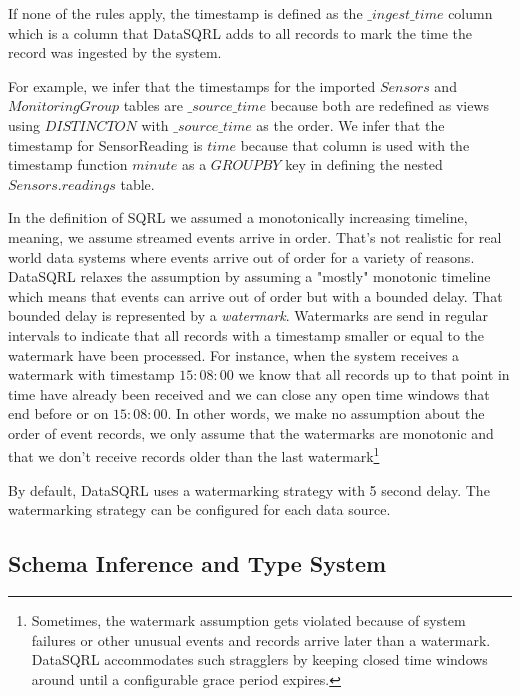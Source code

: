 \documentclass[	DIV=calc,%
							paper=letter,%
							fontsize=11pt,%
							twocolumn]{scrartcl}	 					%
\begin{document}
If none of the rules apply, the timestamp is defined as the $\_ingest\_time$ column which is a column that DataSQRL adds to all records to mark the time the record was ingested by the system.

For example, we infer that the timestamps for the imported $Sensors$ and $MonitoringGroup$ tables are $\_source\_time$ because both are redefined as views using $DISTINCT ON$ with $\_source\_time$ as the order. We infer that the timestamp for SensorReading is $time$ because that column is used with the timestamp function $minute$ as a $GROUP BY$ key in defining the nested $Sensors.readings$ table.

In the definition of SQRL we assumed a monotonically increasing timeline, meaning, we assume streamed events arrive in order. That's not realistic for real world data systems where events arrive out of order for a variety of reasons. DataSQRL relaxes the assumption by assuming a "mostly" monotonic timeline which means that events can arrive out of order but with a bounded delay. That bounded delay is represented by a \emph{watermark}. Watermarks are send in regular intervals to indicate that all records with a timestamp smaller or equal to the watermark have been processed. For instance, when the system receives a watermark with timestamp $15:08:00$ we know that all records up to that point in time have already been received and we can close any open time windows that end before or on $15:08:00$. In other words, we make no assumption about the order of event records, we only assume that the watermarks are monotonic and that we don't receive records older than the last watermark\footnote{Sometimes, the watermark assumption gets violated because of system failures or other unusual events and records arrive later than a watermark. DataSQRL accommodates such stragglers by keeping closed time windows around until a configurable grace period expires.}

By default, DataSQRL uses a watermarking strategy with 5 second delay. The watermarking strategy can be configured for each data source.

\subsection{Schema Inference and Type System}
\end{document}

